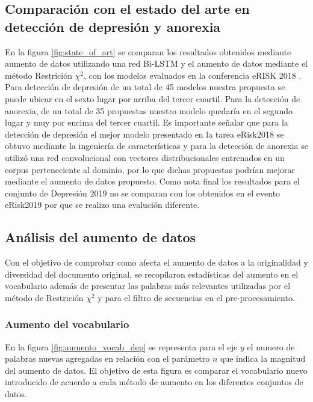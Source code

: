 \subsection{Comparación con el estado del arte en detección de depresión y anorexia}
En la figura \ref{fig:state_of_art} se comparan los resultados obtenidos mediante aumento de datos utilizando una red Bi-LSTM y el aumento de datos mediante el método Restrición $\chi^2$, con los modelos evaluados en la conferencia eRISK 2018 \citep{Losada2018}. Para detección de depresión de un total de 45 modelos nuestra propuesta se puede ubicar en el sexto lugar por arriba del tercer cuartil. Para la detección de anorexia, de un total de 35 propuestas nuestro modelo quedaría en el segundo lugar y muy por encima del tercer cuartil. Es importante señalar que para la detección de depresión el mejor modelo presentado en la tarea eRisk2018 se obtuvo mediante la ingeniería de características y para la detección de anorexia se utilizó una red convolucional con vectores distribucionales entrenados en un corpus perteneciente al dominio, por lo que dichas propuestas podrían mejorar mediante el aumento de datos propuesto. Como nota final los resultados para el conjunto de Depresión 2019 no se comparan con los obtenidos en el evento eRisk2019 por que se realizo una evalución diferente.






\subsection{Análisis del aumento de datos}
Con el objetivo de comprobar como afecta el aumento de datos a la originalidad y diversidad del documento original, se recopilaron estadísticas del aumento en el vocabulario además de presentar las palabras más relevantes utilizadas por el método de Restrición $\chi^2$ y para el filtro de secuencias en el pre-procesamiento.

\subsubsection{Aumento del vocabulario}
En la figura \ref{fig:aumento_vocab_dep} se representa para el eje $y$ el numero de palabras nuevas agregadas en relación con el parámetro $n$ que indica la magnitud del aumento de datos. El objetivo de esta figura es comparar el vocabulario nuevo introducido de acuerdo a cada método de aumento en los diferentes conjuntos de datos.

